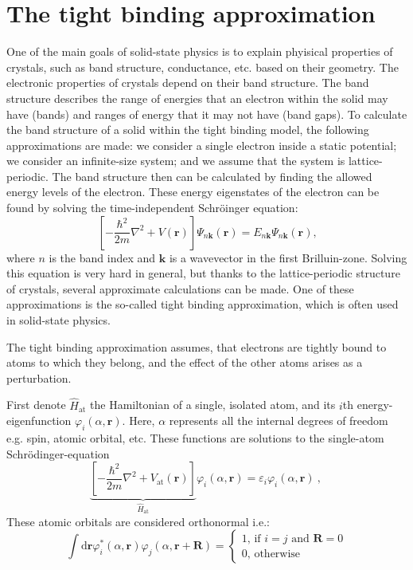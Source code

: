 \documentclass[11pt, a4paper, twocolumn]{article}
\newcommand{\bb}[1]{\mathbf{#1}}
\newcommand{\dd}{\mathrm{d}}
\begin{document}
\section*{The tight binding approximation}
One of the main goals of solid-state physics is to explain phyisical properties of crystals,
such as band structure, conductance, etc. based on their geometry. The electronic properties of crystals
depend on their band structure. The band structure describes the range of energies that an electron 
within the solid may have (bands) and ranges of energy that it may not have (band gaps). 
To calculate the band structure of a solid within the tight binding model, the following approximations are made:
we consider a single electron inside a static potential; we consider an infinite-size system; and we assume that
the system is lattice-periodic. The band structure then can be calculated by finding the allowed energy levels
of the electron. These energy eigenstates of the electron can be found by solving the time-independent Schröinger equation:
\begin{equation*}
  \left[ -\frac{\hbar^2}{2m} \nabla^2 + V(\bb r) \right]\Psi_{n\bb k}(\bb r) = E_{n\bb k}\Psi_{n\bb k}(\bb r) \textrm{,}
\end{equation*}
where $n$ is the band index and $\bb k$ is a wavevector in the first Brilluin-zone. 
Solving this equation is very hard in general, but thanks to the lattice-periodic structure of crystals,
several approximate calculations can be made. One of these approximations is the so-called tight binding approximation,
which is often used in solid-state physics. 
\par The tight binding approximation assumes, that electrons are tightly bound to atoms to which they belong, and the effect 
of the other atoms arises as a perturbation.

First denote $\hat H_{\textrm{at}}$ the Hamiltonian of a single, isolated atom, 
and its $i$th energy-eigenfunction $\varphi_i(\alpha,\bb r)$.
Here, $\alpha$ represents all the internal degrees of freedom e.g. spin, atomic orbital, etc.
These functions are solutions to the single-atom Schrödinger-equation
\begin{equation*}
  \underbrace{ \left[ -\frac{\hbar^2}{2m} \nabla^2 + V_{\textrm{at}}(\bb r) \right]}_{\hat H_{\textrm{at}}} \varphi_i(\alpha, \bb r)
  = \varepsilon_i\varphi_i(\alpha, \bb r)~\textrm{, }
\end{equation*} 
These atomic orbitals are considered orthonormal i.e.:
\begin{equation*}
  \int\dd \bb r \varphi_i^{*}(\alpha, \bb r)\varphi_j(\alpha, \bb r + \bb R) 
  = \left\{ \begin{array}{ll}
    1 \textrm{, if $i=j$ and $\bb R = 0$} \\
    0 \textrm{, otherwise}
  \end{array} \right.
\end{equation*}
\end{document}
